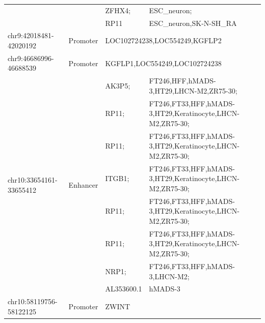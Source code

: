 \begin{table}[]
\begin{tabularx}{\textwidth}{lllX}
                                               &                            & ZFHX4;      & ESC\_neuron;                                                                    \\
                                               &                            & RP11        & ESC\_neuron,SK-N-SH\_RA                                                         \\
    chr9:42018481-42020192                     & Promoter                   & \multicolumn{2}{l}{LOC102724238,LOC554249,KGFLP2}                                             \\
    chr9:46686996-46688539                     & Promoter                   & \multicolumn{2}{l}{KGFLP1,LOC554249,LOC102724238}                                             \\
    \multirow{8}{*}{chr10:33654161-33655412}   & \multirow{8}{*}{Enhancer}  & AK3P5;      & FT246,HFF,hMADS-3,HT29,LHCN-M2,ZR75-30;                                         \\
                                               &                            & RP11;       & FT246,FT33,HFF,hMADS-3,HT29,Keratinocyte,LHCN-M2,ZR75-30;                       \\
                                               &                            & RP11;       & FT246,FT33,HFF,hMADS-3,HT29,Keratinocyte,LHCN-M2,ZR75-30;                       \\
                                               &                            & ITGB1;      & FT246,FT33,HFF,hMADS-3,HT29,Keratinocyte,LHCN-M2,ZR75-30;                       \\
                                               &                            & RP11;       & FT246,FT33,HFF,hMADS-3,HT29,Keratinocyte,LHCN-M2,ZR75-30;                       \\
                                               &                            & RP11;       & FT246,FT33,HFF,hMADS-3,HT29,Keratinocyte,LHCN-M2,ZR75-30;                       \\
                                               &                            & NRP1;       & FT246,FT33,HFF,hMADS-3,LHCN-M2;                                                 \\
                                               &                            & AL353600.1  & hMADS-3                                                                         \\
    chr10:58119756-58122125                    & Promoter                   & ZWINT       &                                                                                 \\

\end{tabularx}
\end{table}
